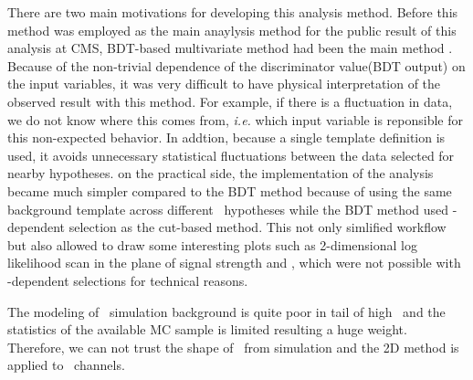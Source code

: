 There are two main motivations for developing this analysis method. 
Before this method was employed as the main anaylysis method for the 
public result of this analysis at CMS, BDT-based multivariate method 
had been the main method \cite{CMS-PAS-HIG-12-038}. Because of 
the non-trivial dependence of the discriminator value(BDT output)
on the input variables, it was very difficult to have 
physical interpretation of the observed result with this method. 
For example, if there is a fluctuation in data, we do not know where this comes from, 
\textit{i.e.} which input variable is reponsible for this non-expected 
behavior. In addtion, because a single template definition is used, 
it avoids unnecessary statistical fluctuations between the data selected 
for nearby hypotheses.
on the practical side, the implementation of the 
analysis became much simpler compared to the BDT method because of using 
the same background template across different \mHi\ hypotheses
while the BDT method used \mHi-dependent selection as the cut-based 
method. This not only simlified workflow but also allowed to draw some 
interesting plots such as 2-dimensional log likelihood scan in the plane of 
signal strength and \mHi, which were not possible with \mHi-dependent 
selections for technical reasons. 

The modeling of \dyll\ simulation background is quite poor in tail of high \met\
and the statistics of the available MC sample is limited resulting a huge weight. 
Therefore, we can not trust the shape of \dyll\ from simulation and  
the 2D method is applied to \DF\ channels. 

